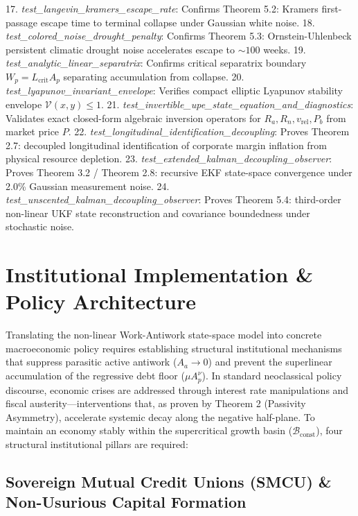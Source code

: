\documentclass[preprint,12pt,authoryear]{elsarticle}
\theoremstyle{definition}
\begin{document}
17. \textit{test\_langevin\_kramers\_escape\_rate}: Confirms Theorem 5.2: Kramers first-passage escape time to terminal collapse under Gaussian white noise.
18. \textit{test\_colored\_noise\_drought\_penalty}: Confirms Theorem 5.3: Ornstein-Uhlenbeck persistent climatic drought noise accelerates escape to $\sim 100$ weeks.
19. \textit{test\_analytic\_linear\_separatrix}: Confirms critical separatrix boundary $W_p = L_{\text{crit}} A_p$ separating accumulation from collapse.
20. \textit{test\_lyapunov\_invariant\_envelope}: Verifies compact elliptic Lyapunov stability envelope $\mathcal{V}(x, y) \le 1$.
21. \textit{test\_invertible\_upe\_state\_equation\_and\_diagnostics}: Validates exact closed-form algebraic inversion operators for $R_a, R_n, v_{\text{rel}}, P_b$ from market price $P$.
22. \textit{test\_longitudinal\_identification\_decoupling}: Proves Theorem 2.7: decoupled longitudinal identification of corporate margin inflation from physical resource depletion.
23. \textit{test\_extended\_kalman\_decoupling\_observer}: Proves Theorem 3.2 / Theorem 2.8: recursive EKF state-space convergence under 2.0\% Gaussian measurement noise.
24. \textit{test\_unscented\_kalman\_decoupling\_observer}: Proves Theorem 5.4: third-order non-linear UKF state reconstruction and covariance boundedness under stochastic noise.

  

\section{Institutional Implementation \& Policy Architecture}



Translating the non-linear Work-Antiwork state-space model into concrete macroeconomic policy requires establishing structural institutional mechanisms that suppress parasitic active antiwork ($A_a \to 0$) and prevent the superlinear accumulation of the regressive debt floor ($\mu A_p^\nu$). In standard neoclassical policy discourse, economic crises are addressed through interest rate manipulations and fiscal austerity---interventions that, as proven by Theorem 2 (Passivity Asymmetry), accelerate systemic decay along the negative half-plane. To maintain an economy stably within the supercritical growth basin ($\mathcal{B}_{\text{const}}$), four structural institutional pillars are required:

\subsection{Sovereign Mutual Credit Unions (SMCU) \& Non-Usurious Capital Formation}
\end{document}
